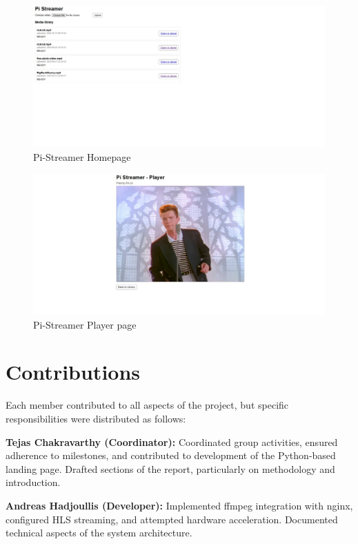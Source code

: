 \documentclass[11pt]{article}
\begin{document}
\begin{figure}[H]
    \centering
    \includegraphics[width=2\linewidth]{pi-streamer-homepage.png}
    \caption{Pi-Streamer Homepage}
    \label{fig:pi-streamer-homepage}
\end{figure}
\begin{figure}[H]
    \centering
    \hspace*{-6cm}                                                           
    \includegraphics[width=2\linewidth,]{pi-streamer-playerpage.png}
    \caption{Pi-Streamer Player page}
    \label{fig:pi-streamer-playerpage}
\end{figure}

\section{Contributions}
Each member contributed to all aspects of the project, but specific responsibilities were distributed as follows:

\textbf{Tejas Chakravarthy (Coordinator):} Coordinated group activities, ensured adherence to milestones, and contributed to development of the Python-based landing page. Drafted sections of the report, particularly on methodology and introduction.


\textbf{Andreas Hadjoullis (Developer):} Implemented ffmpeg integration with nginx, configured HLS streaming, and attempted hardware acceleration. Documented technical aspects of the system architecture.
\end{document}
